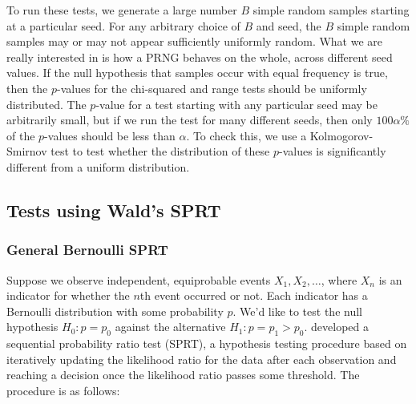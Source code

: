 \documentclass[12pt]{article}
\begin{document}
To run these tests, we generate a large number $B$ simple random samples starting at a particular seed. 
For any arbitrary choice of $B$ and seed, the $B$ simple random samples may or may not appear sufficiently uniformly random. 
What we are really interested in is how a PRNG behaves on the whole, across different seed values.
If the null hypothesis that samples occur with equal frequency is true, then the $p$-values for the chi-squared and range tests should be uniformly distributed. 
The $p$-value for a test starting with any particular seed may be arbitrarily small, but if we run the test for many different seeds, then only $100 \alpha \%$ of the $p$-values should be less than $\alpha$.
To check this, we use a Kolmogorov-Smirnov test to test whether the distribution of these $p$-values is significantly different from a uniform distribution.
%


\subsection{Tests using Wald's SPRT}
\subsubsection{General Bernoulli SPRT}

Suppose we observe independent, equiprobable events $X_1, X_2, \dots$, where $X_n$ is an indicator for whether the $n$th event occurred or not. 
Each indicator has a Bernoulli distribution with some probability $p$. 
We'd like to test the null hypothesis $H_0: p = p_0$ against the alternative $H_1: p = p_1 > p_0$. 
\citet{wald_sequential_1947} developed a sequential probability ratio test (SPRT), a hypothesis testing procedure based on iteratively updating the likelihood ratio for the data after each observation and reaching a decision once the likelihood ratio passes some threshold.
The procedure is as follows:
\end{document}
